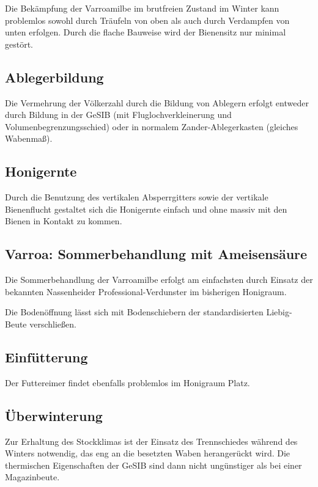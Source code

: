 \documentclass[12pt,a4paper,ngerman]{scrartcl}
\begin{document}
Die Bekämpfung der Varroamilbe im brutfreien Zustand im Winter kann problemlos sowohl durch Träufeln von oben als auch durch Verdampfen von unten erfolgen.
Durch die flache Bauweise wird der Bienensitz nur minimal gestört.



\subsection{Ablegerbildung}

Die Vermehrung der Völkerzahl durch die Bildung von Ablegern erfolgt
entweder durch Bildung in der GeSIB (mit Fluglochverkleinerung und Volumenbegrenzungsschied)
oder in normalem Zander-Ablegerkasten (gleiches Wabenmaß).


\subsection{Honigernte}

Durch die Benutzung des vertikalen Absperrgitters sowie
der vertikale Bienenflucht
gestaltet sich die Honigernte einfach und ohne massiv mit den Bienen in Kontakt zu kommen.


\subsection{Varroa: Sommerbehandlung mit Ameisensäure}

Die Sommerbehandlung der Varroamilbe erfolgt am einfachsten durch Einsatz der bekannten
Nassenheider Professional-Verdunster im bisherigen Honigraum.

Die Bodenöffnung lässt sich mit Bodenschiebern der standardisierten Liebig-Beute verschließen.


\subsection{Einfütterung}

Der Futtereimer findet ebenfalls problemlos im Honigraum Platz.


\subsection{Überwinterung}

Zur Erhaltung des Stockklimas ist der Einsatz des Trennschiedes während des Winters notwendig, das eng an die besetzten Waben herangerückt wird.
Die thermischen Eigenschaften der GeSIB sind dann nicht ungünstiger als bei einer Magazinbeute.
\end{document}
